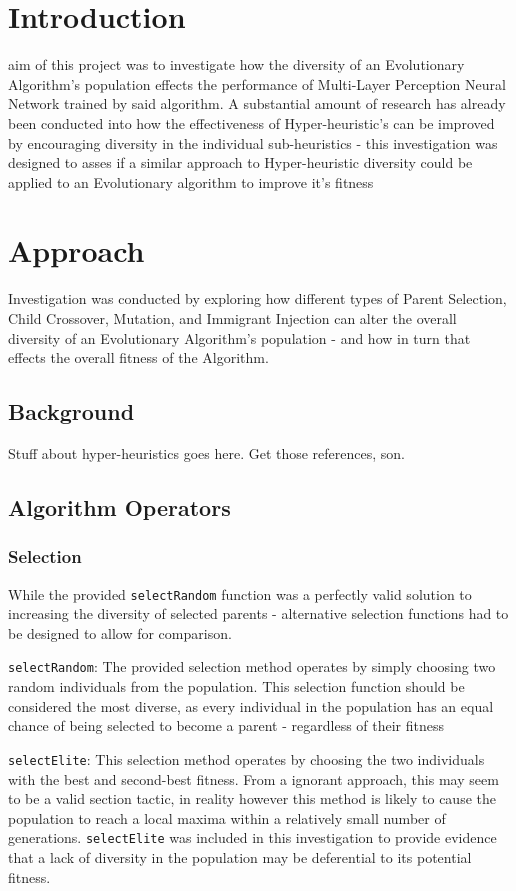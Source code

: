 \section{Introduction}
	 aim of this project was to investigate how the diversity of an Evolutionary Algorithm's population effects the performance of Multi-Layer Perception Neural Network trained by said algorithm. 
	A substantial amount of research has already been conducted into how the effectiveness of Hyper-heuristic's can be improved by encouraging diversity in the individual sub-heuristics - this investigation was designed to asses if a similar approach to Hyper-heuristic diversity could be applied to an Evolutionary algorithm to improve it's fitness
	
\section{Approach}
	Investigation was conducted by exploring how different types of Parent Selection, Child Crossover, Mutation, and Immigrant Injection can alter the overall diversity of an Evolutionary Algorithm's population - and how in turn that effects the overall fitness of the Algorithm.
	
	\subsection{Background}
		Stuff about hyper-heuristics goes here. Get those references, son.
	
	\subsection{Algorithm Operators}
		\subsubsection{Selection}
			While the provided \texttt{selectRandom} function was a perfectly valid solution to increasing the diversity of selected parents - alternative selection functions had to be designed to allow for comparison.
			
			\texttt{selectRandom}: The provided selection method operates by simply choosing two random individuals from the population. This selection function should be considered the most diverse, as every individual in the population has an equal chance of being selected to become a parent - regardless of their fitness
	
			\texttt{selectElite}: This selection method operates by choosing the two individuals with the best and second-best fitness. From a ignorant approach, this may seem to be a valid section tactic, in reality however this method is likely to cause the population to reach a local maxima within a relatively small number of generations. \texttt{selectElite} was included in this investigation to provide evidence that a lack of diversity in the population may be deferential to its potential fitness.
			
